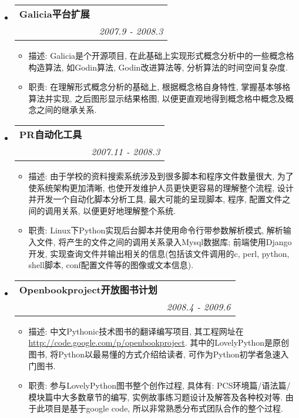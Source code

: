 \documentclass[letterpaper,11pt]{article}
\makeatletter
\newcommand{\resitem}[1]{\item #1 \vspace{-2pt}}
\newcommand{\resheading}[1]{{\large \parashade[.9]{sharpcorners}{\textbf{#1 \vphantom{p\^{E}}}}}}
\newcommand{\ressubheading}[4]{
\begin{tabular*}{6.5in}{l@{\extracolsep{\fill}}r}
		\textbf{#1} & #2 \\
		\textit{#3} & \textit{#4} \\
\end{tabular*}\vspace{-6pt}}
\makeatother
\begin{document}
\begin{CJK}{UTF8}{hei}
\resheading{项目经历}
\begin{itemize}

\item
	\ressubheading{Galicia平台扩展}{}{}{2007.9 - 2008.3}
	\begin{itemize}
		\resitem{	描述: Galicia是个开源项目, 在此基础上实现形式概念分析中的一些概念格构造算法, 如Godin算法, Godin改进算法等, 分析算法的时间空间复杂度.}
		\resitem{	职责: 在理解形式概念分析的基础上, 根据概念格自身特性, 掌握基本够格算法并实现, 之后图形显示结果格图, 以便更直观地得到概念格中概念及概念之间的继承关系.}
	\end{itemize}
	
\item
	\ressubheading{PR自动化工具}{}{}{2007.11 - 2008.3}
	\begin{itemize}
		\resitem{	描述: 由于学校的资料搜索系统涉及到很多脚本和程序文件数量很大, 为了使系统架构更加清晰, 也使开发维护人员更快更容易的理解整个流程, 设计并开发一个自动化脚本分析工具, 最大可能的呈现脚本, 程序, 配置文件之间的调用关系, 以便更好地理解整个系统.}
		\resitem{	职责: Linux下Python实现后台脚本并使用命令行带参数解析模式, 解析输入文件, 将产生的文件之间的调用关系录入Mysql数据库; 前端使用Django开发, 实现查询文件并输出相关的信息(包括该文件调用的c, perl, python, shell脚本, conf配置文件等的图像或文本信息).}
	\end{itemize}

\item
	\ressubheading{Openbookproject开放图书计划}{}{}{2008.4 - 2009.6}
	\begin{itemize}
		\resitem{	描述: 中文Pythonic技术图书的翻译编写项目, 其工程网址在 \href{http://code.google.com/p/openbookproject/}{http://code.google.com/p/openbookproject}. 其中的LovelyPython是原创图书, 将Python以最易懂的方式介绍给读者, 可作为Python初学者急速入门图书.}
		\resitem{	职责: 参与LovelyPython图书整个创作过程, 具体有: PCS环境篇/语法篇/模块篇中大多数章节的编写, 实例故事练习题设计及解答及各种校对等. 由于此项目是基于google code, 所以非常熟悉分布式团队合作的整个过程.}
	\end{itemize}


\end{itemize}
\end{CJK}
\end{document}

